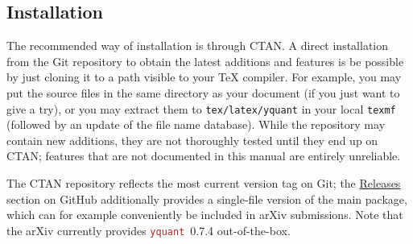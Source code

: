 \documentclass{scrartcl}
\def\pkg#1{\textcolor{brown}{\texttt{#1}}}
\def\Yquant{\pkg{yquant}}
\begin{document}
      \subsection{Installation}
         The recommended way of installation is through CTAN.
         A direct installation from the Git repository to obtain the latest additions and features is be possible by just cloning it to a path visible to your \TeX{} compiler.
         For example, you may put the source files in the same directory as your document (if you just want to give a try), or you may extract them to \texttt{tex/latex/yquant} in your local \texttt{texmf} (followed by an update of the file name database).
         While the repository may contain new additions, they are not thoroughly tested until they end up on CTAN; features that are not documented in this manual are entirely unreliable.

         The CTAN repository reflects the most current version tag on Git; the \href{https://github.com/projekter/yquant/releases}{Releases} section on GitHub additionally provides a single\hyp file version of the main package, which can for example conveniently be included in arXiv submissions.
         Note that the arXiv currently provides \Yquant{}~0.7.4 out\hyp of\hyp the\hyp box.
\end{document}
